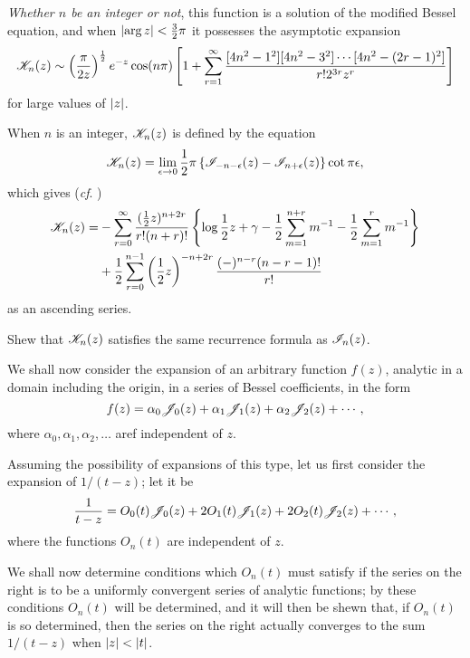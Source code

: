 %
%
\emph{Whether $n$ be an integer or not}, this function is a
solution of the modified Bessel equation, and when
$\left| \arg z \right| < \frac{3}{2} \pi$ it possesses the asymptotic
expansion
$$
\mathscr{K}_{n}(z)
\sim
\left(  \frac{\pi}{2z}  \right)^{\frac{1}{2}}
e^{-z}
\cos (n\pi)
\left[ 
  1
  +
  \sum_{r=1}^{\infty}
  \frac{ [4n^{2}-1^{2}] [4n^{2}-3^{2}] \cdots [4n^{2} - (2r-1)^{2}]}{r! 2^{3r} z^{r}}
 \right]
$$
for large values of $\left| z \right|$.

When $n$ is an integer, $\mathscr{K}_{n}(z)$ is defined by the equation
$$
\mathscr{K}_{n}(z)
=
\lim_{\epsilon\rightarrow 0}
\frac{1}{2} \pi
\left\{  \mathscr{I}_{-n-\epsilon}(z) - \mathscr{I}_{n+\epsilon}(z) \right\} \cot \pi\epsilon,
$$
which gives (\emph{cf}. )
\begin{align*}
  \mathscr{K}_{n}(z)
  =&
  -\sum_{r=0}^{\infty}
  \frac{(\frac{1}{2} z)^{n+2r}}{r! (n+r)!}
  \left\{ 
    \log \frac{1}{2} z + \gamma
    - \frac{1}{2} \sum_{m=1}^{n+r} m^{-1}
    - \frac{1}{2} \sum_{m=1}^{r} m^{-1}
   \right\}
  \\
  &
  + \frac{1}{2} \sum_{r=0}^{n-1}
  \left( \frac{1}{2} z \right)^{-n+2r}
  \frac{(-)^{n-r} (n-r-1)!}{r!}
\end{align*}
as an ascending series.
\begin{wandwexample}
  Shew that $\mathscr{K}_{n}(z)$ satisfies the same recurrence formula as
  $\mathscr{I}_{n}(z)$.
\end{wandwexample}

We shall now consider the expansion of an arbitrary function
$f(z)$, analytic in a domain including the origin, in a series
of Bessel coefficients, in the form
$$
f(z) = \alpha_{0} \mathscr{J}_{0}(z) + \alpha_{1} \mathscr{J}_{1}(z) + \alpha_{2}
\mathscr{J}_{2}(z) + \cdots,
$$
where $\alpha_{0}, \alpha_{1}, \alpha_{2},\ldots$ aref independent of
$z$.

Assuming the possibility of expansions of this type, let us first
consider the expansion of $1/(t-z)$; let it be
$$
\frac{1}{t-z}
=
O_{0}(t) \mathscr{J}_{0}(z)
+ 2 O_{1}(t) \mathscr{J}_{1}(z)
+ 2 O_{2}(t) \mathscr{J}_{2}(z)
+ \cdots,
$$
where the functions $O_{n}(t)$ are independent of $z$.

We shall now determine conditions which $O_{n}(t)$ must satisfy if the
series on the right is to be a uniformly convergent series of analytic
functions; by these conditions $O_{n}(t)$ will be determined, and it
will then be shewn that, if $O_{n}(t)$ is so determined, then the series
on the right actually converges to the sum $1/(t-z)$ when
$\left| z \right| < \left| t \right|$.

